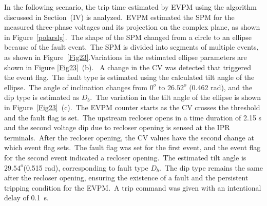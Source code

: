 In the following scenario, the trip time estimated by EVPM using the algorithm discussed in Section~(IV) is analyzed.~EVPM estimated the SPM for the measured three-phase voltages and its projection on the complex plane, as shown in Figure~\ref{polarslg}.~The shape of the SPM changed from a circle to an ellipse because of the fault event.~The SPM is divided into segments of multiple events, as shown in Figure~\ref{Fig23}.Variations in the estimated ellipse parameters are shown in Figure \ref{Fig23}~(b). ~A change in the CV was detected that triggered the event flag.~The fault type is estimated using the calculated tilt angle of the ellipse.~The angle of inclination changes from $0^o$ to $ 26.52^o$ (0.462 rad), and the dip type is estimated as $D_b$.~The variation in the tilt angle of the ellipse is shown in Figure~\ref{Fig23}~(c).~The EVPM counter starts as the CV crosses the threshold and the fault flag is set.~The upstream recloser opens in a time duration of 2.15 s and the second voltage dip due to recloser opening is sensed at the IPR terminals.~After the recloser opening, the CV values have the second change at which event flag sets.~The fault flag was set for the first event, and the event flag for the second event indicated a recloser opening.~The estimated tilt angle is $ 29.54^o $(0.515 rad), corresponding to fault type $D_b$.~The dip type remains the same after the recloser opening, ensuring the existence of a fault and the persistent tripping condition for the EVPM.~A trip command was given with an intentional delay of 0.1~s.




